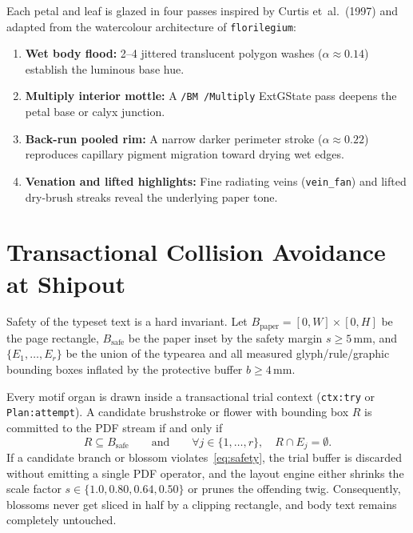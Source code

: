 \documentclass[11pt,a4paper,twoside]{article}
\begin{document}
Each petal and leaf is glazed in four passes inspired by Curtis et~al.~(1997) and adapted from the watercolour architecture of \texttt{florilegium}:
\begin{enumerate}
  \item \textbf{Wet body flood:} 2--4 jittered translucent polygon washes ($\alpha \approx 0.14$) establish the luminous base hue.
  \item \textbf{Multiply interior mottle:} A \texttt{/BM /Multiply} ExtGState pass deepens the petal base or calyx junction.
  \item \textbf{Back-run pooled rim:} A narrow darker perimeter stroke ($\alpha \approx 0.22$) reproduces capillary pigment migration toward drying wet edges.
  \item \textbf{Venation and lifted highlights:} Fine radiating veins (\texttt{vein\_fan}) and lifted dry-brush streaks reveal the underlying paper tone.
\end{enumerate}

\clearpage
{}

\section{Transactional Collision Avoidance at Shipout}

Safety of the typeset text is a hard invariant. Let $B_{\mathrm{paper}} = [0, W] \times [0, H]$ be the page rectangle, $B_{\mathrm{safe}}$ be the paper inset by the safety margin $s \ge 5\,\mathrm{mm}$, and $\{E_1, \dots, E_r\}$ be the union of the typearea and all measured glyph/rule/graphic bounding boxes inflated by the protective buffer $b \ge 4\,\mathrm{mm}$.

Every motif organ is drawn inside a transactional trial context (\texttt{ctx:try} or \texttt{Plan:attempt}). A candidate brushstroke or flower with bounding box $R$ is committed to the PDF stream if and only if
\begin{equation}
  R \subseteq B_{\mathrm{safe}}
  \qquad \text{and} \qquad
  \forall j \in \{1, \dots, r\}, \quad R \cap E_j = \emptyset.
  \label{eq:safety}
\end{equation}
If a candidate branch or blossom violates~\eqref{eq:safety}, the trial buffer is discarded without emitting a single PDF operator, and the layout engine either shrinks the scale factor $s \in \{1.0, 0.80, 0.64, 0.50\}$ or prunes the offending twig. Consequently, blossoms never get sliced in half by a clipping rectangle, and body text remains completely untouched.
\end{document}
